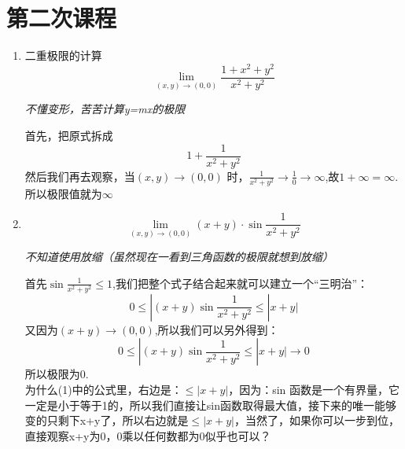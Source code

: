 \documentclass{ctexart}
\newcommand{\cbox}[2][yellow]{%
  \colorbox{#1}{\parbox{\dimexpr\linewidth-2\fboxsep}{\strut #2\strut}}%
}
\begin{document}
\section{第二次课程}
\begin{enumerate}
    \item 二重极限的计算
    \[  \lim\limits_{(x,y)\rightarrow (0,0)}{\frac{1+x^{2}+y^{2}}{x^{2}+y^{2}}} \]
    \cbox[gray!30]{\textsl{不懂变形，苦苦计算y=mx的极限}}
    首先，把原式拆成
    \[1+\frac{1}{x^2+y^2}\]
    然后我们再去观察，当$(x,y) \rightarrow(0,0)$ 时，$\frac{1}{x^2+y^2} \rightarrow \frac{1}{0} \rightarrow \infty$,故$1+\infty=\infty$. 
    所以极限值就为$\infty$

    \item  \[  \lim\limits_{(x,y)\rightarrow (0,0)}{(x+y) \cdot \sin{\frac{1}{x^{2}+y^{2}}}} \]
     \cbox[gray!30]{\textsl{不知道使用放缩（虽然现在一看到三角函数的极限就想到放缩）}}

    首先$\sin{\frac{1}{x^2+y^2}}\leq 1$,我们把整个式子结合起来就可以建立一个“三明治”：
    \begin{equation}
    \tag{1}
    0\leq |(x+y)\sin{\frac{1}{x^2+y^2}} \leq |x+y|
    \end{equation}
    又因为$(x+y) \rightarrow (0,0)$,所以我们可以另外得到：
    \[
    0\leq |(x+y)\sin{\frac{1}{x^2+y^2}} \leq |x+y| \rightarrow 0
    \]
    所以极限为0. \\ 
    为什么(1)中的公式里，右边是：$\leq |x+y|$，因为：sin 函数是一个有界量，它一定是小于等于1的，所以我们直接让sin函数取得最大值，接下来的唯一能够变的只剩下x+y了，所以右边就是$\leq |x+y|$，当然了，如果你可以一步到位，直接观察x+y为0，0乘以任何数都为0似乎也可以？
    
\end{enumerate}
\end{document}
